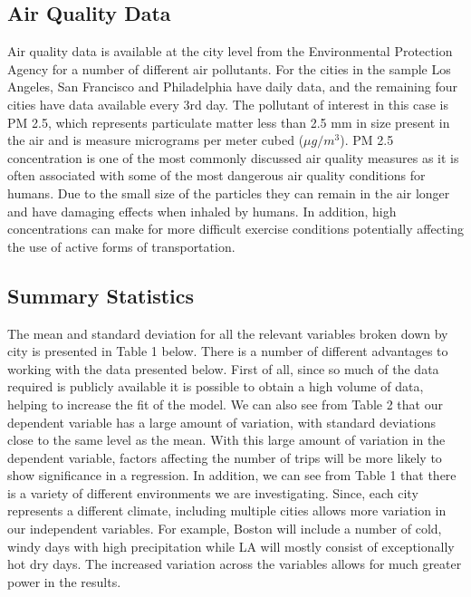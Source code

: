 \documentclass[12pt,letter paper]{article}
\begin{document}
\subsection{Air Quality Data}
Air quality data is available at the city level from the Environmental Protection Agency for a number of different air pollutants.  For the cities in the sample Los Angeles, San Francisco and Philadelphia have daily data, and the remaining four cities have data available every 3rd day.  The pollutant of interest in this case is PM 2.5, which represents particulate matter less than 2.5 mm in size present in the air and is measure micrograms per meter cubed ($\mu g /m^3$).  PM 2.5 concentration is one of the most commonly discussed air quality measures as it is often associated with some of the most dangerous air quality conditions for humans.  Due to the small size of the particles they can remain in the air longer and have damaging effects when inhaled by humans.  In addition, high concentrations can make for more difficult exercise conditions potentially affecting the use of active forms of transportation.  




\subsection{Summary Statistics}
The mean and standard deviation for all the relevant variables broken down by city is presented in Table 1 below.  There is a number of different advantages to working with the data presented below.  First of all, since so much of the data required is publicly available it is possible to obtain a high volume of data, helping to increase the fit of the model.  We can also see from Table 2 that our dependent variable has a large amount of variation, with standard deviations close to the same level as the mean.  With this large amount of variation in the dependent variable, factors affecting the number of trips will be more likely to show significance in a regression.  In addition, we can see from Table 1 that there is a variety of different environments we are investigating.  Since, each city represents a different climate, including multiple cities allows more variation in our independent variables.  For example, Boston will include a number of cold, windy days with high precipitation while LA will mostly consist of exceptionally hot dry days.  The increased variation across the variables allows for much greater power in the results.\\
\end{document}
